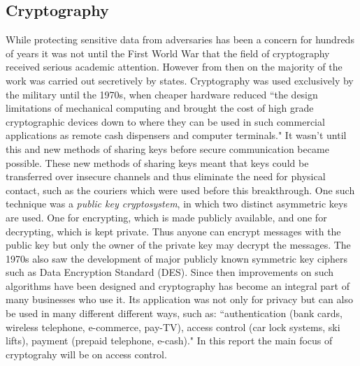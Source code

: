 \documentclass[12pt, titlepage]{article}
\begin{document}
\subsection{Cryptography}
While protecting sensitive data from adversaries has been a concern for hundreds of years it was not until the First World War that the field of cryptography received serious academic attention. However from then on the majority of the work was carried out secretively by states.\cite{appliedCryptoBook} Cryptography was used exclusively by the military until the 1970s, when cheaper hardware reduced ``the design limitations of mechanical computing and brought the cost of high grade cryptographic devices down to where they can be used in such commercial applications as remote cash dispensers and computer terminals."\cite{newCryptoDirections} It wasn't until this and new methods of sharing keys before secure communication became possible. These new methods of sharing keys meant that keys could be transferred over insecure channels and thus eliminate the need for physical contact, such as the couriers which were used before this breakthrough. One such technique was a \textit{public key cryptosystem}, in which two distinct asymmetric keys are used. One for encrypting, which is made publicly available, and one for decrypting, which is kept private. Thus anyone can encrypt messages with the public key but only the owner of the private key may decrypt the messages. The 1970s also saw the development of major publicly known symmetric key ciphers such as Data Encryption Standard (DES). Since then improvements on such algorithms have been designed and cryptography has become an integral part of many businesses who use it. Its application was not only for privacy but can also be used in many different different ways, such as: ``authentication (bank cards, wireless telephone, e-commerce, pay-TV), access control (car lock systems, ski lifts), payment (prepaid telephone, e-cash)."\cite{classicalCryptoBook} In this report the main focus of cryptograhy will be on access control.
\end{document}
